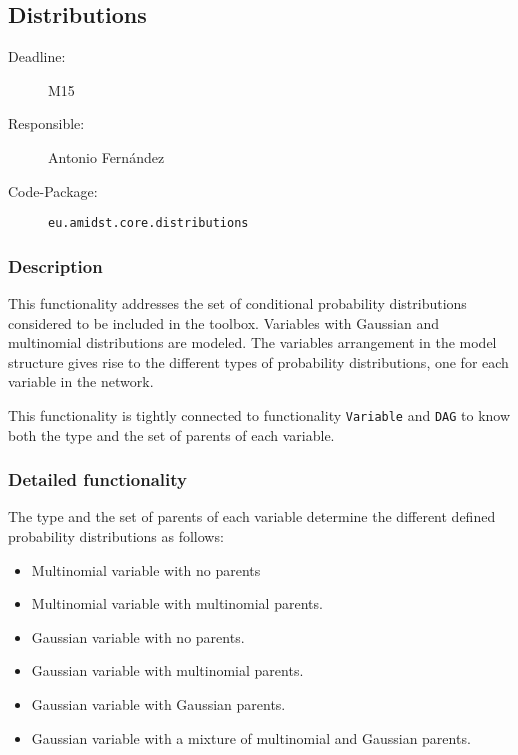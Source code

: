 \newpage
\subsection{Distributions}
\label{Distributions:D}

\begin{description}
\item[Deadline:] M15
\item[Responsible:] Antonio Fern\'andez
\item[Code-Package:] \texttt{eu.amidst.core.distributions}
\end{description}

\subsubsection*{Description}

This functionality addresses the set of conditional probability distributions considered to be included in the toolbox. Variables with Gaussian and multinomial distributions are modeled. The variables arrangement in the model structure gives rise to the different types of probability distributions, one for each variable in the network. 

This functionality is tightly connected to functionality \texttt{Variable} and \texttt{DAG} to know both the type and the set of parents of each variable.

\subsubsection*{Detailed functionality}

The type and the set of parents of each variable determine the different defined probability distributions as follows:

\begin{itemize}
\item Multinomial variable with no parents
\item Multinomial variable with multinomial parents.
\item Gaussian variable with no parents.
\item Gaussian variable with multinomial parents.
\item Gaussian variable with Gaussian parents. 
\item Gaussian variable with a mixture of multinomial and Gaussian parents. 
\end{itemize}

